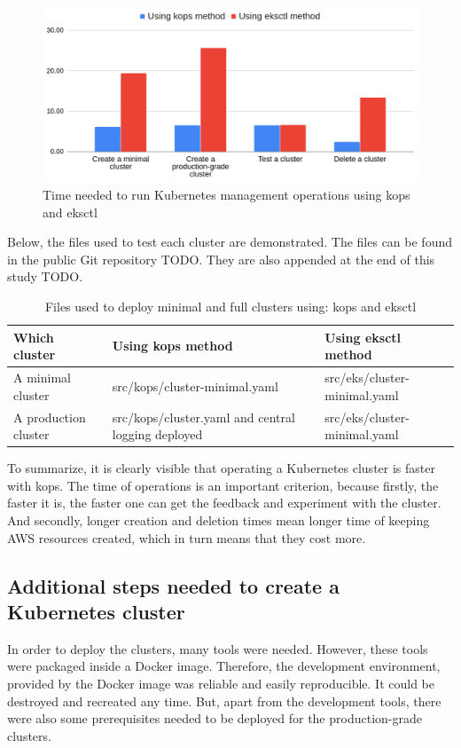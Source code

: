\begin{figure}[H]
    \centering
    \includegraphics[width=15cm]{figures/k8s-time.png}
    \captionsetup{justification=centering,margin=2cm}
    \caption{Time needed to run Kubernetes management operations using kops and eksctl}
\end{figure}


Below, the files used to test each cluster are demonstrated. The files can be found in the public Git repository TODO. They are also appended at the end of this study TODO.
\begin{table}[H]
\small
\begin{tabularx}{1\textwidth} {
  | >{\centering\arraybackslash}X
  | >{\centering\arraybackslash}X
  | >{\centering\arraybackslash}X |}
 \hline
  \textbf{Which cluster} & \textbf{Using kops method} & \textbf{Using eksctl method} \\
 \hline
 A minimal cluster & src/kops/cluster-minimal.yaml & src/eks/cluster-minimal.yaml \\
 \hline
 A production cluster & src/kops/cluster.yaml and central logging deployed & src/eks/cluster-minimal.yaml \\
 \hline
\end{tabularx}
\caption{\label{tab:comparison-which-file}Files used to deploy minimal and full clusters using: kops and eksctl}
\end{table}

To summarize, it is clearly visible that operating a Kubernetes cluster is faster with kops. The time of operations is an important criterion, because firstly, the faster it is, the faster one can get the feedback and experiment with the cluster. And secondly, longer creation and deletion times mean longer time of keeping AWS resources created, which in turn means that they cost more.

\subsection{Additional steps needed to create a Kubernetes cluster}
In order to deploy the clusters, many tools were needed. However, these tools were packaged inside a Docker image. Therefore, the development environment, provided by the Docker image was reliable and easily reproducible. It could be destroyed and recreated any time. But, apart from the development tools, there were also some prerequisites needed to be deployed for the production-grade clusters.

